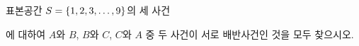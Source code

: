 표본공간 $S=\{1{,}\mkern3mu\mathopen{}2{,}\mkern3mu\mathopen{}3{,}\mkern3mu\mathopen{}\ldots{,}\mkern3mu\mathopen{}9\}$의 세 사건\par\smallskip{}\par{}\par\smallskip\noindent 에 대하여 $A$와 $B$, $B$와 $C$, $C$와 $A$ 중 두 사건이 서로 배반사건인 것을 모두 찾으시오.
